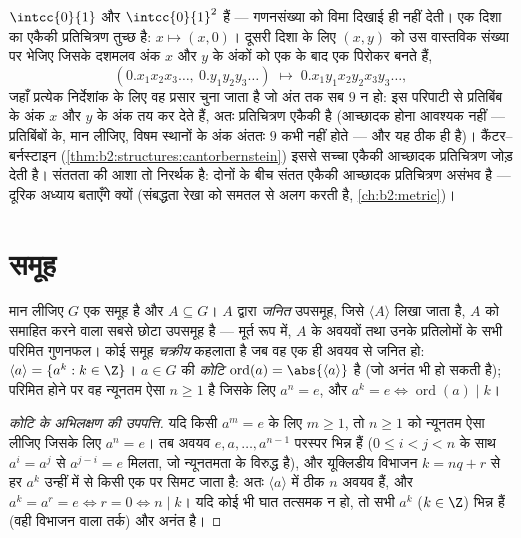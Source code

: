 \begin{example}[खंड और वर्ग]\label{ex:b2:structures:squareseg}
$\intcc{0}{1}$ और $\intcc{0}{1}^2$  हैं --- गणनसंख्या को विमा दिखाई ही नहीं देती। एक
दिशा का एकैकी प्रतिचित्रण तुच्छ है: $x
\mapsto (x, 0)$। दूसरी दिशा के लिए $(x, y)$ को उस
वास्तविक संख्या पर भेजिए जिसके दशमलव अंक $x$ और $y$ के अंकों को एक के
बाद एक पिरोकर बनते हैं,
\[
(0.x_1x_2x_3\dots,\ 0.y_1y_2y_3\dots)
\;\longmapsto\; 0.x_1y_1x_2y_2x_3y_3\dots,
\]
जहाँ प्रत्येक निर्देशांक के लिए वह प्रसार चुना जाता है जो अंत तक सब $9$
न हो: इस परिपाटी से प्रतिबिंब के अंक $x$ और $y$ के अंक तय कर देते
हैं, अतः प्रतिचित्रण एकैकी है (आच्छादक होना आवश्यक नहीं --- प्रतिबिंबों
के, मान लीजिए, विषम स्थानों के अंक अंततः $9$ कभी नहीं होते --- और यह
ठीक ही है)। कैंटर--बर्नस्टाइन (\cref{thm:b2:structures:cantorbernstein}) इससे सच्चा एकैकी आच्छादक
प्रतिचित्रण जोड़ देती है। संततता की आशा तो निरर्थक है: दोनों के बीच
संतत एकैकी आच्छादक प्रतिचित्रण असंभव है --- दूरिक अध्याय बताएँगे क्यों
(संबद्धता रेखा को समतल से अलग करती है, \cref{ch:b2:metric})।
\end{example}

\section{समूह}

\begin{definition}[जनित उपसमूह; कोटि]\label{def:b2:structures:generated}
मान लीजिए $G$ एक समूह है और $A \subseteq G$। $A$ द्वारा \emph{जनित} उपसमूह, जिसे
$\langle A \rangle$ लिखा जाता है, $A$ को समाहित करने वाला सबसे छोटा उपसमूह है ---
मूर्त रूप में, $A$ के अवयवों तथा उनके प्रतिलोमों के सभी परिमित गुणनफल।
कोई समूह \emph{चक्रीय} कहलाता है जब वह एक ही अवयव से
जनित हो: $\langle a\rangle = \{a^k : k \in \Z\}$। $a \in G$ की \emph{कोटि} $\operatorname{ord}(a) = \abs{\langle a \rangle}$ है (जो अनंत
भी हो सकती है); परिमित होने पर वह न्यूनतम ऐसा $n \geq 1$ है जिसके लिए $a^n = e$,
और $a^k = e \iff \operatorname{ord}(a) \mid k$।
\end{definition}

\begin{proof}[कोटि के अभिलक्षण की उपपत्ति]
यदि किसी $a^m = e$ के लिए $m \geq 1$, तो $n \geq 1$ को न्यूनतम ऐसा लीजिए जिसके लिए $a^n
= e$।
तब अवयव $e, a, \dots, a^{n-1}$ परस्पर भिन्न हैं ($0 \leq i < j < n$ के साथ $a^{i} = a^{j}$ से $a^{j-i} = e$ मिलता, जो
न्यूनतमता के विरुद्ध है), और यूक्लिडीय विभाजन $k = nq + r$ से हर $a^k$ उन्हीं में
से किसी एक पर सिमट जाता है: अतः $\langle a\rangle$ में ठीक $n$ अवयव हैं, और $a^k = a^r = e \iff r = 0 \iff n \mid k$।
यदि कोई भी घात तत्समक न हो, तो सभी $a^k$ ($k \in \Z$) भिन्न हैं (वही विभाजन
वाला तर्क) और  अनंत है।
\end{proof}


